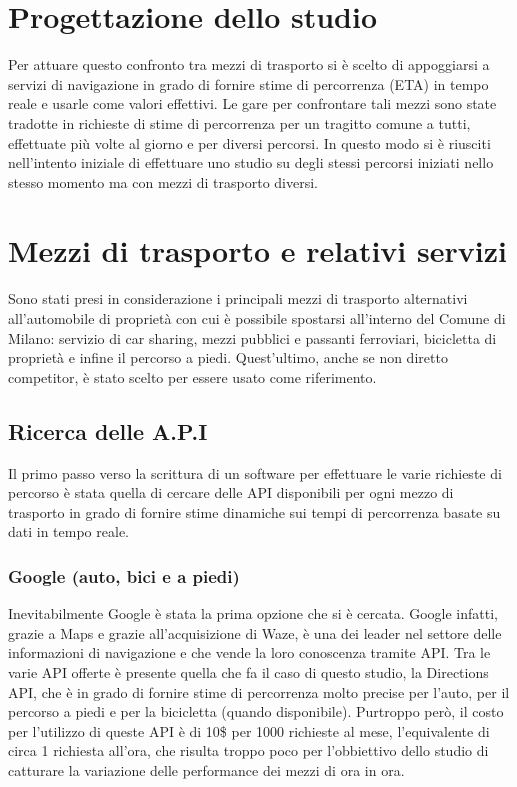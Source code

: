 \section{Progettazione dello studio}

Per attuare questo confronto tra mezzi di trasporto si è scelto di appoggiarsi a servizi di navigazione in grado di fornire stime di percorrenza (ETA) in tempo reale e usarle come valori effettivi. Le gare per confrontare tali mezzi sono state tradotte in richieste di stime di percorrenza per un tragitto comune a tutti, effettuate più volte al giorno e per diversi percorsi. In questo modo si è riusciti nell'intento iniziale di effettuare uno studio su degli stessi percorsi iniziati nello stesso momento ma con mezzi di trasporto diversi.

\section{Mezzi di trasporto e relativi servizi}

Sono stati presi in considerazione i principali mezzi di trasporto alternativi all'automobile di proprietà con cui è possibile spostarsi all'interno del Comune di Milano: servizio di car sharing, mezzi pubblici e passanti ferroviari, bicicletta di proprietà e infine il percorso a piedi. Quest'ultimo, anche se non diretto competitor, è stato scelto per essere usato come riferimento.

\subsection{Ricerca delle A.P.I}

Il primo passo verso la scrittura di un software per effettuare le varie richieste di percorso è stata quella di cercare delle API disponibili per ogni mezzo di trasporto in grado di fornire stime dinamiche sui tempi di percorrenza basate su dati in tempo reale.

\subsubsection{Google (auto, bici e a piedi)}

Inevitabilmente Google è stata la prima opzione che si è cercata. Google infatti, grazie a Maps e grazie all'acquisizione di Waze\cite{googleblog}, è una dei leader nel settore delle informazioni di navigazione e che vende la loro conoscenza tramite API. Tra le varie API offerte è presente quella che fa il caso di questo studio, la Directions API, che è in grado di fornire stime di percorrenza molto precise per l'auto, per il percorso a piedi e per la bicicletta (quando disponibile)\cite{googleapi}. Purtroppo però, il costo per l'utilizzo di queste API è di 10\$ per 1000 richieste al mese, l'equivalente di circa 1 richiesta all'ora, che risulta troppo poco per l'obbiettivo dello studio di catturare la variazione delle performance dei mezzi di ora in ora\cite{googleapiprice}.


